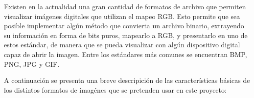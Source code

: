 Existen en la actualidad una gran cantidad de formatos de archivo que permiten visualizar imágenes digitales que utilizan el mapeo RGB. Esto permite que sea posible implementar algún método que convierta un archivo binario, extrayendo su información en forma de bits puros, mapearlo a RGB, y presentarlo en uno de estos  estándar, de manera que se pueda visualizar con algún dispositivo digital capaz de abrir la imagen. Entre los estándares más comunes se encuentran BMP, PNG, JPG y GIF.


A continuación se presenta una breve descripición de las características básicas de los distintos formatos de imagénes que se pretenden usar en este proyecto:

